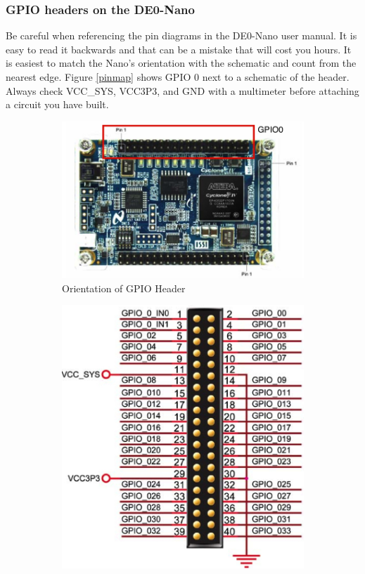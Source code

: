       \subsubsection{GPIO headers on the DE0-Nano} 
        Be careful when referencing the pin diagrams in the DE0-Nano user manual. It is easy to read it backwards and that can be a mistake that will cost you hours. It is easiest to match the Nano's orientation with the schematic and count from the nearest edge. Figure \ref{pinmap} shows GPIO 0 next to a schematic of the header. Always check VCC\_SYS, VCC3P3, and GND with a multimeter before attaching a circuit you have built. 
        \begin{figure}
          \centering
          \begin{subfigure}[b]{.38\textwidth}
            \includegraphics[angle=270, width=.9\textwidth]{Images/LabeledGPIOHeaders.jpg}
            \caption{Orientation of GPIO Header\cite{DE0Manual}}
          \end{subfigure}
          \begin{subfigure}[b]{.45\textwidth}
            \includegraphics[width=\textwidth]{Images/GPIOHeader.jpg}

\end{subfigure}
\end{figure}
